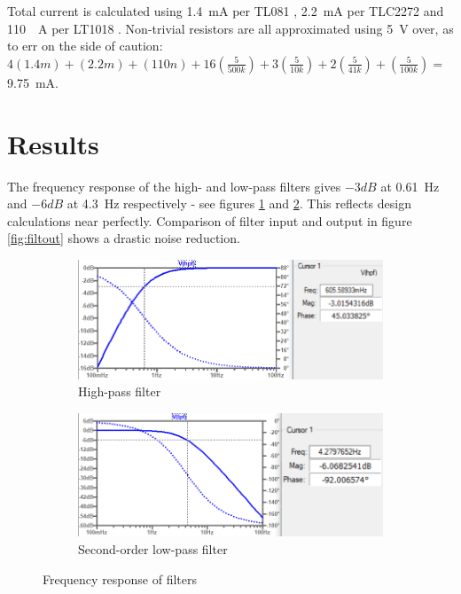 Total current is calculated using \SI{1.4}{mA} per TL081 \cite{tl081}, \SI{2.2}{mA} per TLC2272 \cite{tlc2272} and \SI{110}{\mu A} per LT1018 \cite{lt1018}. Non-trivial resistors are all approximated using \SI{5}{V} over, as to err on the side of caution: $4(1.4m) + (2.2m) + (110n) + 16\left(\frac{5}{500k}\right) + 3\left(\frac{5}{10k}\right) +
 2\left(\frac{5}{41k}\right) + \left(\frac{5}{100k}\right) =$ \SI{9.75}{mA}.

\vspace{-0.3cm}
\section{Results} \label{sec:heartResults}

The frequency response of the high- and low-pass filters gives $-3dB$ at \SI{0.61}{Hz} and $-6dB$ at \SI{4.3}{Hz} respectively - see figures \ref{subfig:hpf} and \ref{subfig:lpf1}. This reflects design calculations near perfectly. Comparison of filter input and output in figure \ref{fig:filtout} shows a drastic noise reduction.


\begin{figure}[h]
 \footnotesize
   \centering
   \begin{subfigure}[]{0.48\textwidth}
        \includegraphics[width=\linewidth]{./Figures/hpf}
	  \caption{High-pass filter} \label{subfig:hpf}	
   \end{subfigure}
   \begin{subfigure}[]{0.48\textwidth}
  	 \includegraphics[width=\linewidth]{./Figures/lpf1}
	  \caption{Second-order low-pass filter} \label{subfig:lpf1}	
   \end{subfigure}
   \caption {Frequency response of filters}
   \label{fig:freqreq}
 \end{figure}
 
